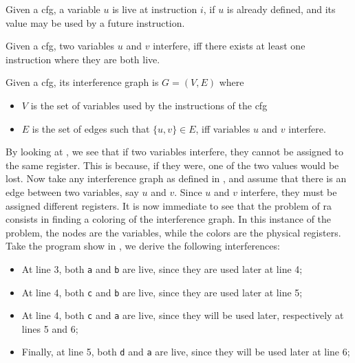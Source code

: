 \begin{definition}[Liveness]\label{def:liveness}
  Given a \gls{cfg}, a variable $u$ is live at instruction $i$, if $u$ is already defined, and its value may be used by a future instruction.
\end{definition}

\begin{definition}[Interference]
  Given a \gls{cfg}, two variables $u$ and $v$ interfere, iff there exists at least one instruction where they are both live.
\end{definition}

\begin{definition}\label{def:ig}
  Given a \gls{cfg}, its interference graph is $G = (V, E)$ where
  \begin{itemize}
  \item $V$ is the set of variables used by the instructions of the \gls{cfg}
  \item $E$ is the set of edges such that $\{ u, v \} \in E$, iff variables $u$ and $v$ interfere.
  \end{itemize}
\end{definition}

By looking at , we see that if two variables interfere, they cannot be assigned to the same register. This is because, if they were, one of the two values would be lost.
Now take any interference graph as defined in , and assume that there is an edge between two variables, say $u$ and $v$. Since $u$ and $v$ interfere, they must be assigned different registers.
It is now immediate to see that the problem of \gls{ra} consists in finding a coloring of the interference graph. In this instance of the problem, the nodes are the variables, while the colors are the physical registers.
Take the program show in , we derive the following interferences:
\begin{itemize}
  \item At line 3, both \texttt a and \texttt b are live, since they are used later at line 4;
  \item At line 4, both \texttt c and \texttt b are live, since they are used later at line 5;
  \item At line 4, both \texttt c and \texttt a are live, since they will be used later, respectively at lines 5 and 6;
  \item Finally, at line 5, both \texttt d and \texttt a are live, since they will be used later at line 6;
\end{itemize}

